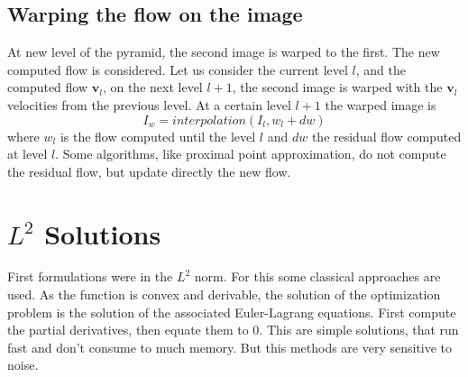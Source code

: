 \documentclass[12pt,a4paper,twoside]{report}
\begin{document}
{\subsection{Warping the flow on the image}

At new level of the pyramid, the second image is warped to the first.
The new computed flow is considered.
Let us consider the current level $l$, and the computed flow $\boldsymbol{v}_l$, on the next level $l+1$, the second image is warped with the $\boldsymbol{v}_l$ velocities from the previous level.
At a certain level $l+1$ the warped image is 
\begin{equation}
I_w = interpolation(I_l, w_l+dw)
\end{equation}
where $w_l$ is the flow computed until the level $l$ and $dw$ the  residual flow computed at level $l$. Some algorithms, like proximal point approximation, do not compute the residual flow, but update directly the new flow.

\section{$L^2$ Solutions}

First formulations were in the $L^2$ norm. For this some classical approaches are used. As the function is convex and derivable, the solution of the optimization problem is the solution of the associated Euler-Lagrang equations. First compute the partial derivatives, then equate them to 0. This are simple solutions, that run fast and don't consume to much memory. But this methods are very sensitive to noise. 

}
\end{document}
